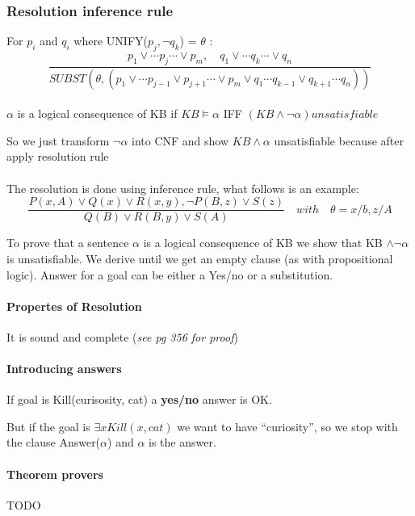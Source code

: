 \subsubsection{Resolution inference rule}
For $p_i$ and $q_i$ where UNIFY($p_j, \neg q_k$) = $\theta$ :
$$ \frac{p_1 \vee \cdots p_j \cdots \vee p_m, \quad q_1 \vee \cdots q_k \cdots \vee q_n}
{SUBST(\theta, (p_1 \vee \cdots p_{j-1} \vee p_{j+1} \cdots \vee p_m \vee q_1 \cdots q_{k-1} 
\vee q_{k+1} \cdots q_n))}$$

\paragraph{ } $\alpha$ is a logical consequence of KB if $KB \models \alpha$
IFF $(KB \wedge \neg \alpha) unsatisfiable$


So we just transform $\neg \alpha$ into CNF and show $KB \wedge \alpha$ unsatisfiable
because after apply resolution rule 

\paragraph{}
The resolution is done using inference rule, what follows is an example:\\
$$\frac{P(x,A)\vee Q(x) \vee R(x,y), \neg P(B,z)\vee S(z)}{Q(B) \vee R(B,y)\vee S(A)}\quad with\quad \theta 
= {x/b,z/A}$$

To prove that a sentence $\alpha$ is a logical consequence of KB we show
that KB $\wedge\neg\alpha$  is unsatisfiable. We derive until  we get an
empty clause  (as with propositional  logic). Answer  for a goal  can be
either a Yes/no or a substitution.


\paragraph{Propertes of Resolution} It is sound and complete (\textit{see pg 356 for proof}) 

\paragraph{Introducing answers}
If goal is Kill(curisosity, cat) a \textbf{yes/no} answer is OK.

But if the goal is $\exists x Kill(x, cat)$ we want to have ``curiosity'',
so we stop with the clause Answer($\alpha$) and  $\alpha$ is the answer.

\paragraph{Theorem provers} TODO

